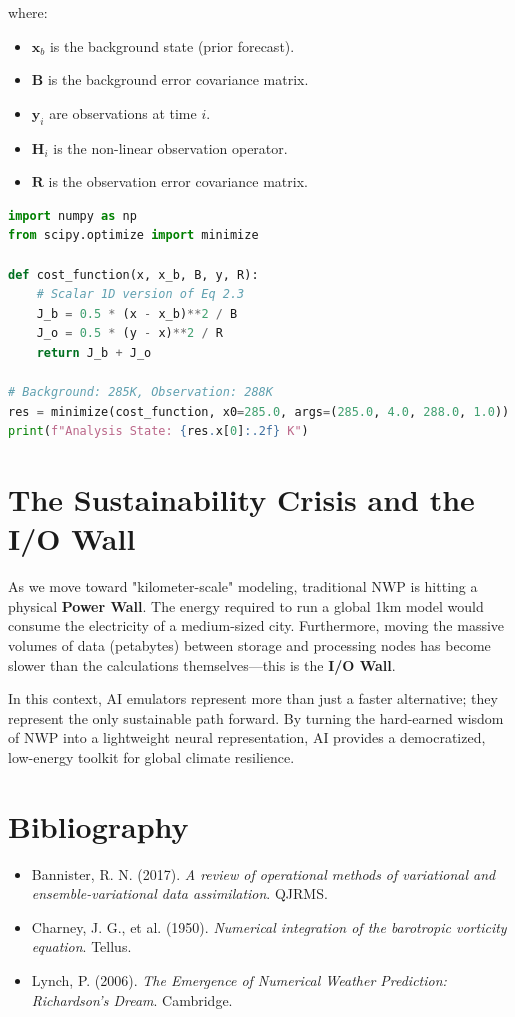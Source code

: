 where:
\begin{itemize}
    \item $\mathbf{x}_b$ is the background state (prior forecast).
    \item $\mathbf{B}$ is the background error covariance matrix.
    \item $\mathbf{y}_i$ are observations at time $i$.
    \item $\mathbf{H}_i$ is the non-linear observation operator.
    \item $\mathbf{R}$ is the observation error covariance matrix.
\end{itemize}

\begin{lstlisting}[language=Python, caption=1D Variational Data Assimilation Implementation]
import numpy as np
from scipy.optimize import minimize

def cost_function(x, x_b, B, y, R):
    # Scalar 1D version of Eq 2.3
    J_b = 0.5 * (x - x_b)**2 / B
    J_o = 0.5 * (y - x)**2 / R
    return J_b + J_o

# Background: 285K, Observation: 288K
res = minimize(cost_function, x0=285.0, args=(285.0, 4.0, 288.0, 1.0))
print(f"Analysis State: {res.x[0]:.2f} K")
\end{lstlisting}

\section{The Sustainability Crisis and the I/O Wall}

As we move toward "kilometer-scale" modeling, traditional NWP is hitting a physical \textbf{Power Wall}. The energy required to run a global 1km model would consume the electricity of a medium-sized city. Furthermore, moving the massive volumes of data (petabytes) between storage and processing nodes has become slower than the calculations themselves—this is the \textbf{I/O Wall}. 

In this context, AI emulators represent more than just a faster alternative; they represent the only sustainable path forward. By turning the hard-earned wisdom of NWP into a lightweight neural representation, AI provides a democratized, low-energy toolkit for global climate resilience.

\section*{Bibliography}
\begin{itemize}
    \item Bannister, R. N. (2017). \textit{A review of operational methods of variational and ensemble-variational data assimilation}. QJRMS.
    \item Charney, J. G., et al. (1950). \textit{Numerical integration of the barotropic vorticity equation}. Tellus.
    \item Lynch, P. (2006). \textit{The Emergence of Numerical Weather Prediction: Richardson's Dream}. Cambridge.
\end{itemize}
